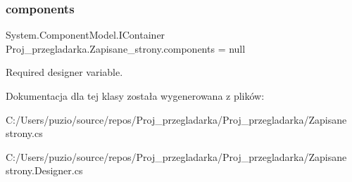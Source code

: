 \subsubsection{\texorpdfstring{components}{components}}
{\footnotesize\ttfamily System.\+Component\+Model.\+I\+Container Proj\+\_\+przegladarka.\+Zapisane\+\_\+strony.\+components = null\hspace{0.3cm}{\ttfamily [private]}}



Required designer variable. 



Dokumentacja dla tej klasy została wygenerowana z plików\+:\begin{DoxyCompactItemize}
\item 
C\+:/\+Users/puzio/source/repos/\+Proj\+\_\+przegladarka/\+Proj\+\_\+przegladarka/Zapisane strony.\+cs\item 
C\+:/\+Users/puzio/source/repos/\+Proj\+\_\+przegladarka/\+Proj\+\_\+przegladarka/Zapisane strony.\+Designer.\+cs\end{DoxyCompactItemize}
